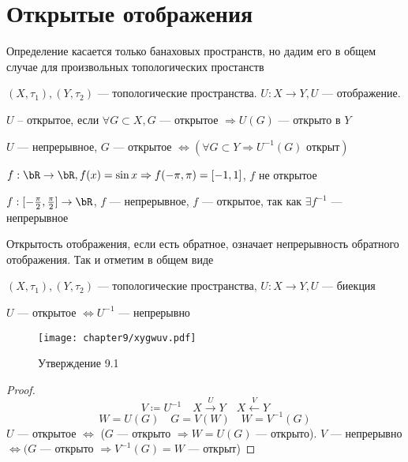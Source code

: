 \documentclass[document]{subfiles}
\begin{document}
\section{Открытые отображения}

Определение касается только банаховых пространств, но дадим его в общем случае для произвольных топологических простанств

\begin{definition}
    $(X, \tau_1), (Y, \tau_2)$ --- топологические пространства. $U: X \rightarrow Y, U$ --- отображение.

    $U$ -- открытое, если $\forall G \subset X, G$ --- открытое $\Rightarrow U(G)$ --- открыто в $Y$
    
\end{definition}

\begin{remark}
    $U$ --- непрерывное, $G$ --- открытое $\Leftrightarrow (\forall G \subset Y \Rightarrow U^{-1}(G) \text{ открыт})$
\end{remark}

\begin{example}
    $f: \bR \rightarrow \bR, f(x) = \sin x \Rightarrow f(-\pi,\pi) = [-1,1]$, $f$ не открытое
\end{example}

\begin{example}
    $f: [-\frac{\pi}{2}, \frac{\pi}{2}] \rightarrow \bR$, $f$ --- непрерывное, $f$ --- открытое, так как $\exists f^{-1}$ --- непрерывное
\end{example}


Открытость отображения, если есть обратное, означает непрерывность обратного отображения. Так и отметим в общем виде 

\begin{statement}
    $(X, \tau_1), (Y, \tau_2)$ --- топологические пространства, $U: X \rightarrow Y, U$ --- биекция 

    $U$ --- открытое $\Leftrightarrow U^{-1}$ --- непрерывно
\end{statement}
\begin{figure}
    \texttt{[image: chapter9/xygwuv.pdf]}\caption{Утверждение 9.1}
\end{figure}
\begin{proof}
    \[V \coloneqq U^{-1} \quad X \stackrel{U}{\longrightarrow} Y \quad X \stackrel{V}{\longleftarrow} Y \]
    \[ W = U(G) \quad G = V(W) \quad W = V^{-1}(G) \] 
    $U$ --- открытое $\Leftrightarrow$ ($G$ --- открыто $\Rightarrow W = U(G)$ --- открыто).
    $V$ --- непрерывно $\Leftrightarrow (G$ --- открыто $\Rightarrow V^{-1}(G) = W$ --- открыт)
\end{proof}
\end{document}
